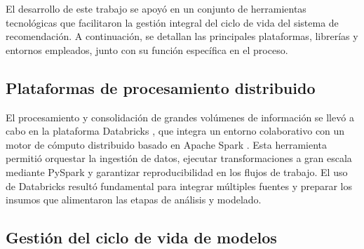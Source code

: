 


El desarrollo de este trabajo se apoyó en un conjunto de herramientas tecnológicas que facilitaron la gestión integral del ciclo de vida del sistema de recomendación. A continuación, se detallan las principales plataformas, librerías y entornos empleados, junto con su función específica en el proceso.

\subsection{Plataformas de procesamiento distribuido}

El procesamiento y consolidación de grandes volúmenes de información se llevó a cabo en la plataforma Databricks \cite{ARTICLE:Databricks}, que integra un entorno colaborativo con un motor de cómputo distribuido basado en Apache Spark \cite{ARTICLE:Spark2012}. Esta herramienta permitió orquestar la ingestión de datos, ejecutar transformaciones a gran escala mediante PySpark y garantizar reproducibilidad en los flujos de trabajo. El uso de Databricks resultó fundamental para integrar múltiples fuentes y preparar los insumos que alimentaron las etapas de análisis y modelado.

\subsection{Gestión del ciclo de vida de modelos}

